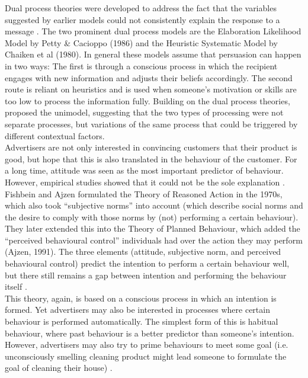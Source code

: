 Dual process theories were developed to address the fact that the variables suggested by earlier models could not consistently explain the response to a message \cite{Xu2017}. The two prominent dual process models are the Elaboration Likelihood Model by Petty \& Cacioppo (1986) and the Heuristic Systematic Model by Chaiken et al (1980). In general these models assume that persuasion can happen in two ways: The first is through a conscious process in which the recipient engages with new information and adjusts their beliefs accordingly. The second route is reliant on heuristics and is used when someone’s motivation or skills are too low to process the information fully. Building on the dual process theories, \cite{Kruglanski1999} proposed the unimodel, suggesting that the two types of processing were not separate  processes, but variations of the same process that could be triggered by different contextual factors. \\

Advertisers are not only interested in convincing customers that their product is good, but hope that this is also translated in the behaviour of the customer. For a long time, attitude was seen as the most important predictor of behaviour. However, empirical studies showed that it could not be the sole explanation \citep{Fennis2015}. Fishbein and Ajzen formulated the Theory of Reasoned Action in the 1970s, which also took “subjective norms” into account (which describe social norms and the desire to comply with those norms by (not) performing a certain behaviour). They later extended this into the Theory of Planned Behaviour, which added the “perceived behavioural control” individuals had over the action they may perform (Ajzen, 1991). The three elements (attitude, subjective norm, and perceived behavioural control) predict the intention to perform a certain behaviour well, but there still remains a gap between intention and performing the behaviour itself \citep{Fennis2015}. \\

This theory, again, is based on a conscious process in which an intention is formed. Yet advertisers may also be interested in processes where certain behaviour is performed automatically.  The simplest form of this is habitual behaviour, where past behaviour is a better predictor than someone’s intention. However, advertisers may also try to prime behaviours to meet some goal (i.e. unconsciously smelling cleaning product might lead someone to formulate the goal of cleaning their house) \citep{Fennis2015}.  


